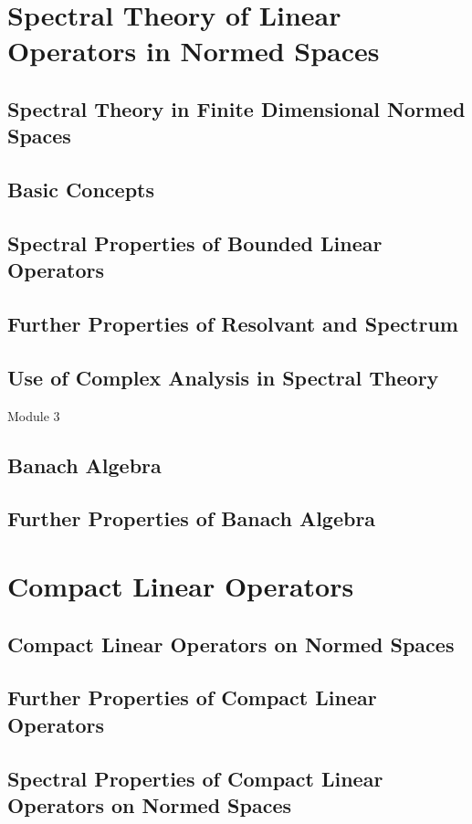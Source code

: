 \section{Spectral Theory of Linear Operators in Normed Spaces}
\subsection{Spectral Theory in Finite Dimensional Normed Spaces}
\subsection{Basic Concepts}
\subsection{Spectral Properties of Bounded Linear Operators}
\subsection{Further Properties of Resolvant and Spectrum}
\subsection{Use of Complex Analysis in Spectral Theory}
\pagebreak

{\Large Module 3}
\subsection{Banach Algebra}
\subsection{Further Properties of Banach Algebra}

\section{Compact Linear Operators}
\subsection{Compact Linear Operators on Normed Spaces}
\subsection{Further Properties of Compact Linear Operators}
\subsection{Spectral Properties of Compact Linear Operators on Normed Spaces}
